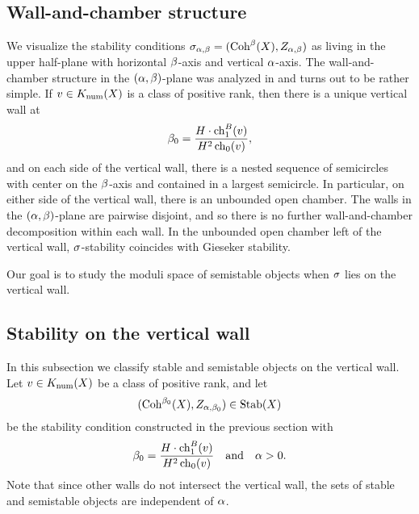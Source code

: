 \documentclass[letterpaper,12pt]{amsart}
\theoremstyle{remark}
\begin{document}
\subsection{Wall-and-chamber structure}
We visualize the stability conditions $\sigma_{\alpha,\beta} = (\mathrm{Coh}^\beta(X), Z_{\alpha,\beta})$ as living in the upper half-plane with horizontal $\beta$-axis and vertical $\alpha$-axis. The wall-and-chamber structure in the $(\alpha,\beta)$-plane was analyzed in \cite{maciocia} and turns out to be rather simple. If $v \in K_{\mathrm{num}}(X)$ is a class of positive rank, then there is a unique vertical wall at 
\[ \beta_0 = \frac{H \cdot \operatorname{\mathrm{ch}}_1^B(v)}{H^2 \operatorname{\mathrm{ch}}_0(v)}, \] and on each side of the vertical wall, there is a nested sequence of semicircles with center on the $\beta$-axis and contained in a largest semicircle. In particular, on either side of the vertical wall, there is an unbounded open chamber. The walls in the $(\alpha,\beta)$-plane are pairwise disjoint, and so there is no further wall-and-chamber decomposition within each wall. In the unbounded open chamber left of the vertical wall, $\sigma$-stability coincides with Gieseker stability.
\begin{center}
\end{center}
Our goal is to study the moduli space of semistable objects when $\sigma$ lies on the vertical wall.

\subsection{Stability on the vertical wall}\label{section:stabvertwall}
In this subsection we classify stable and semistable objects on the vertical wall. Let $v \in K_{\mathrm{num}}(X)$ be a class of positive rank, and let 
\[ (\mathrm{Coh}^{\beta_0}(X), Z_{\alpha,\beta_0}) \in \operatorname{\mathrm{Stab}}(X) \] 
be the stability condition constructed in the previous section with 
\[ \beta_0 = \frac{H \cdot \operatorname{\mathrm{ch}}_1^B(v)}{H^2 \operatorname{\mathrm{ch}}_0(v)} \quad \mathrm{and} \quad \alpha > 0. \] Note that since other walls do not intersect the vertical wall, the sets of stable and semistable objects are independent of $\alpha$.
\end{document}

